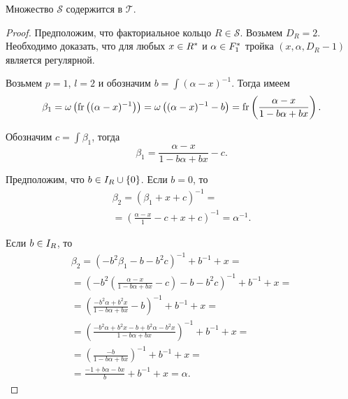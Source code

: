 \documentclass[_00_dissertation.tex]{subfiles}
\begin{document}
\begin{lemma}
    Множество $\mathcal{S}$ содержится в $\mathcal{T}$.
\end{lemma}
\begin{proof}
    Предположим, что факториальное кольцо $R \in \mathcal{S}$.
    Возьмем $D_R = 2$.
    Необходимо доказать, что для любых $x \in R^{*}$ и $\alpha \in F_1^{*}$ тройка $(x, \alpha, D_R - 1)$ является регулярной.
    
    Возьмем $p = 1$, $l = 2$ и обозначим $b = \int{(\alpha - x)^{-1}}$.
    Тогда имеем
    \begin{equation*}
        \beta_1 = \omega\left(
            \textrm{fr}\left((\alpha - x)^{-1}\right)
        \right) = \omega\left(
            (\alpha - x)^{-1} - b
        \right) = \textrm{fr}\left(\frac{\alpha - x}{1 - b\alpha + bx}\right).
    \end{equation*}

    Обозначим $c = \int{\beta_1}$, тогда
    \begin{equation*}
        \beta_1 = \frac{\alpha - x}{1 - b\alpha + bx} - c.
    \end{equation*}

    Предположим, что $b \in I_{R} \cup \{0\}$.
    Если $b = 0$, то
    \begin{equation*}
        \begin{split}
            \beta_2 = \left(
                \beta_1 + x + c
            \right)^{-1} = \\
            = \left(
                \frac{\alpha - x}{1} - c + x + c
            \right)^{-1} = \alpha^{-1}.
        \end{split}
    \end{equation*}

    Если $b \in I_{R}$, то
    \begin{equation*}
        \begin{split}
            \beta_2 = \left(
                -b^2 \beta_1 - b - b^2 c
            \right)^{-1} + b^{-1} + x = \\
            = \left(
                -b^2 \left(
                    \frac{\alpha - x}{1 - b\alpha + bx} - c
                \right) - b - b^2 c
            \right)^{-1} + b^{-1} + x = \\
            = \left(
                \frac{-b^2\alpha + b^2x}{1 - b\alpha + bx} - b
            \right)^{-1} + b^{-1} + x = \\
            = \left(
                \frac{-b^2\alpha + b^2x - b + b^2\alpha - b^2x}{1 - b\alpha + bx}
            \right)^{-1} + b^{-1} + x = \\
            = \left(
                \frac{- b}{1 - b\alpha + bx}
            \right)^{-1} + b^{-1} + x = \\
            = \frac{-1 + b\alpha - bx}{b} + b^{-1} + x = \alpha.
        \end{split}
    \end{equation*}
    

\end{proof}
\end{document}
